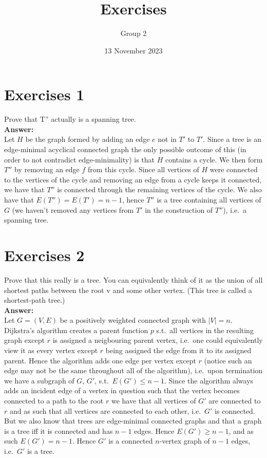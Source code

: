 \documentclass[nobib]{tufte-handout}
\title{Exercises}
\author[Group 2]{Group 2 }%
\date{13 November 2023}
\begin{document}
\maketitle%

\section{Exercises 1}
    Prove that T'' actually is a spanning tree. \\ 

    \textbf{Answer:} \\ 
    Let $H$ be the graph formed by adding an edge $e$ not in $T'$ to $T'$. Since a tree is an edge-minimal acyclical connected graph the only possible outcome of this (in order to not contradict edge-minimality) is that $H$ contains a cycle. We then form $T''$ by removing an edge $f$ from this cycle. Since all vertices of $H$ were connected to the vertices of the cycle and removing an edge from a cycle keeps it connected, we have that $T''$ is connected through the remaining vertices of the cycle. We also have that $E(T'') = E(T') = n - 1$, hence $T''$ is a tree containing all vertices of $G$ (we haven't removed any vertices from $T'$ in the construction of $T''$), i.e.\ a spanning tree.

\newpage

\section{Exercises 2}
  Prove that this really is a tree. You can equivalently think of it as the union of all shortest paths between the root v and some other vertex. (This tree is called a shortest-path tree.) \\
  
  \textbf{Answer:} \\ 
  Let $G = (V, E)$ be a positively weighted connected graph with $|V| = n$. Dijkstra's algorithm creates a parent function $p$ s.t.\ all vertices in the resulting graph except $r$ is assigned a neigbouring parent vertex, i.e.\ one could equivalently view it as every vertex except $r$ being assigned the edge from it to its assigned parent. Hence the algorithm adds one edge per vertex except $r$ (notice such an edge may not be the same throughout all of the algorithm), i.e.\ upon termination we have a subgraph of $G$, $G'$, s.t.\ $E(G') \leq n - 1$. Since the algorithm always adds an incident edge of a vertex in question such that the vertex becomes connected to a path to the root $r$ we have that all vertices of $G'$ are connected to $r$ and as such that all vertices are connected to each other, i.e.\ $G'$ is connected. But we also know that trees are edge-minimal connected graphs and that a graph is a tree iff it is connected and has $n - 1$ edges. Hence $E(G') \geq n - 1$, and as such $E(G') = n - 1$. Hence $G'$ is a connected $n$-vertex graph of $n - 1$ edges, i.e.\ $G'$ is a tree.
\newpage
\end{document}
